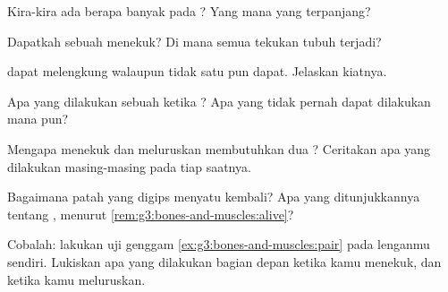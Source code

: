 \begin{exercise}[$\star$]\label{exo:g3:bones-and-muscles:2}
Kira-kira ada berapa banyak  pada ? Yang mana yang
terpanjang?
\end{exercise}

\begin{exercise}[$\star$]\label{exo:g3:bones-and-muscles:3}
Dapatkah sebuah  menekuk? Di mana semua tekukan tubuh terjadi?
\end{exercise}

\begin{exercise}[$\star$]\label{exo:g3:bones-and-muscles:4}
 dapat melengkung walaupun tidak satu pun 
dapat. Jelaskan kiatnya.
\end{exercise}

\begin{exercise}[$\star$]\label{exo:g3:bones-and-muscles:5}
Apa yang dilakukan sebuah  ketika ? Apa yang tidak
pernah dapat dilakukan  mana pun?
\end{exercise}

\begin{exercise}[$\star$]\label{exo:g3:bones-and-muscles:6}
Mengapa menekuk dan meluruskan  membutuhkan dua ? Ceritakan
apa yang dilakukan masing-masing pada tiap saatnya.
\end{exercise}

\begin{exercise}[$\star$]\label{exo:g3:bones-and-muscles:7}
Bagaimana  patah yang digips menyatu kembali? Apa yang
ditunjukkannya tentang , menurut
\cref{rem:g3:bones-and-muscles:alive}?
\end{exercise}

\begin{exercise}[$\star$]\label{exo:g3:bones-and-muscles:8}
Cobalah: lakukan uji genggam \cref{ex:g3:bones-and-muscles:pair} pada
lenganmu sendiri. Lukiskan apa yang dilakukan bagian depan 
ketika kamu menekuk, dan ketika kamu meluruskan.
\end{exercise}

